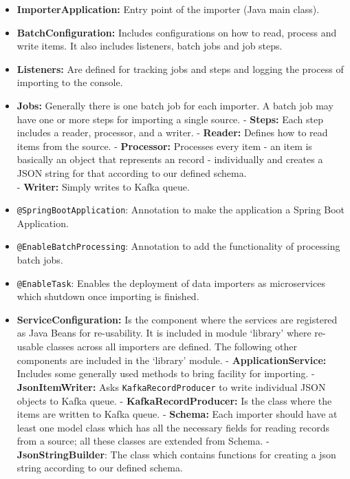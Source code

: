 \begin{itemize}
\tightlist
\item
  \textbf{ImporterApplication:} Entry point of the importer (Java main
  class).
\item
  \textbf{BatchConfiguration:} Includes configurations on how to read,
  process and write items. It also includes listeners, batch jobs and
  job steps.
\item
  \textbf{Listeners:} Are defined for tracking jobs and steps and
  logging the process of importing to the console.
\item
  \textbf{Jobs:} Generally there is one batch job for each importer. A
  batch job may have one or more steps for importing a single source. -
  \textbf{Steps:} Each step includes a reader, processor, and a writer.
  - \textbf{Reader:} Defines how to read items from the source. -
  \textbf{Processor:} Processes every item - an item is basically an
  object that represents an record - individually and creates a JSON
  string for that according to our defined schema.\\
  - \textbf{Writer:} Simply writes to Kafka queue.
\item
  \texttt{@SpringBootApplication}: Annotation to make the application a
  Spring Boot Application.
\item
  \texttt{@EnableBatchProcessing}: Annotation to add the functionality
  of processing batch jobs.
\item
  \texttt{@EnableTask}: Enables the deployment of data importers as
  microservices which shutdown once importing is finished.
\item
  \textbf{ServiceConfiguration:} Is the component where the services are
  registered as Java Beans for re-usability. It is included in module
  `library' where re-usable classes across all importers are defined.
  The following other components are included in the `library' module. -
  \textbf{ApplicationService:} Includes some generally used methods to
  bring facility for importing. - \textbf{JsonItemWriter:} Asks
  \texttt{KafkaRecordProducer} to write individual JSON objects to Kafka
  queue. - \textbf{KafkaRecordProducer:} Is the class where the items
  are written to Kafka queue. - \textbf{Schema:} Each importer should
  have at least one model class which has all the necessary fields for
  reading records from a source; all these classes are extended from
  Schema. - \textbf{JsonStringBuilder}: The class which contains
  functions for creating a json string according to our defined schema.
\end{itemize}

